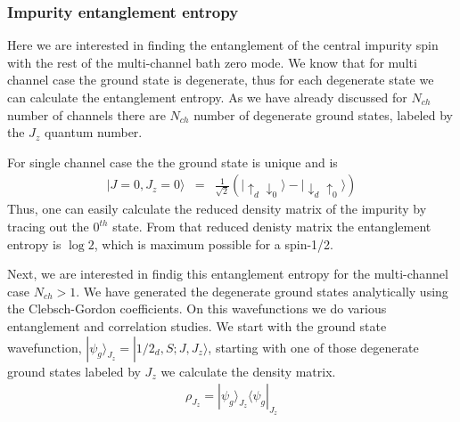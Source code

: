 \documentclass[reprint,prb,superscriptaddress]{revtex4-1}
\begin{document}
\subsubsection{Impurity entanglement entropy}
\noindent Here we are interested in finding the entanglement of the central impurity spin with the rest of the multi-channel bath zero mode. We know that for multi channel case the ground state is degenerate, thus for each degenerate state we can calculate the entanglement entropy. As we have already discussed for $N_{ch}$ number of channels there are $N_{ch}$ number of degenerate ground states, labeled by the $J_z$ quantum number.\\
\par For single channel case the the ground state is unique and is 
\begin{eqnarray}
|J=0,J_z=0 \rangle &=& \frac{1}{\sqrt{2}} (|\uparrow_{d}\downarrow_0\rangle -|\downarrow_d \uparrow_0\rangle)
\end{eqnarray}
Thus, one can easily calculate the reduced density matrix of the impurity by tracing out the $0^{th}$ state. From that reduced denisty matrix the entanglement entropy is $\log 2$, which is maximum possible for a spin-1/2.
\par Next, we are interested in findig this entanglement entropy for the multi-channel case $N_{ch}>1$. We have generated the degenerate ground states analytically using the Clebsch-Gordon coefficients. On this wavefunctions we do various entanglement and correlation studies. We start with the ground state wavefunction, $|\psi_g\rangle_{J_z}=|1/2_{d},S;J,J_z\rangle$, starting with one of those degenerate ground states labeled by $J_z$ we calculate the density matrix.
\begin{eqnarray}
\rho_{J_z}=|\psi_g\rangle_{J_z} \langle\psi_g|_{J_z}
\end{eqnarray}
\end{document}

